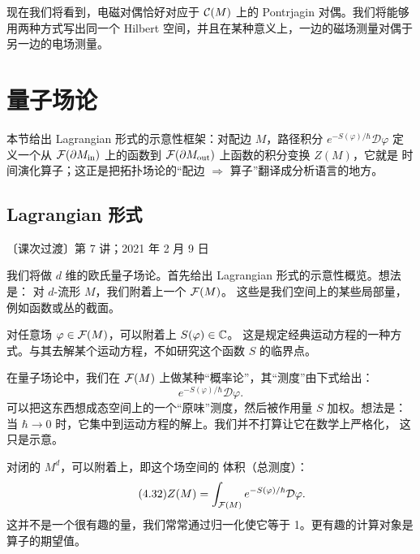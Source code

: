 
现在我们将看到，电磁对偶恰好对应于 $\mathcal{C}(M)$ 上的 Pontrjagin 对偶。我们将能够
用两种方式写出同一个 Hilbert 空间，并且在某种意义上，一边的磁场测量对偶于
另一边的电场测量。

\section{量子场论}
\begin{sectionkey}
本节给出 Lagrangian 形式的示意性框架：对配边 $M$，路径积分
$e^{-S(\varphi)/\hbar}\mathcal{D}\varphi$ 定义一个从 $\mathcal{F}(\partial M_{\mathrm{in}})$
上的函数到 $\mathcal{F}(\partial M_{\mathrm{out}})$ 上函数的积分变换 $Z(M)$，它就是
时间演化算子；这正是把拓扑场论的“配边 $\Rightarrow$ 算子”翻译成分析语言的地方。
\end{sectionkey}

\subsection{Lagrangian 形式}
\label{sec:4-4-1}

\begin{flushright}\small 〔课次过渡〕第 7 讲；2021 年 2 月 9 日\end{flushright}

我们将做 $d$ 维的欧氏量子场论。首先给出 Lagrangian 形式的示意性概览。想法是：
对 $d$-流形 $M$，我们附着上一个 $\mathcal{F}(M)$。
这些是我们空间上的某些局部量，例如函数或丛的截面。

对任意场 $\varphi\in\mathcal{F}(M)$，可以附着上 $S(\varphi)\in\mathbb{C}$。
这是规定经典运动方程的一种方式。与其去解某个运动方程，不如研究这个函数 $S$
的临界点。

在量子场论中，我们在 $\mathcal{F}(M)$ 上做某种“概率论”，其“测度”由下式给出：
\begin{equation}\tag{4.31}
e^{-S(\varphi)/\hbar}\mathcal{D}\varphi.
\end{equation}
可以把这东西想成态空间上的一个“原味”测度，然后被作用量 $S$ 加权。想法是：
当 $\hbar\to0$ 时，它集中到运动方程的解上。我们并不打算让它在数学上严格化，
这只是示意。

对闭的 $M^{d}$，可以附着上，即这个场空间的
体积（总测度）：
\begin{equation}\tag{4.32}
Z(M)=\int_{\mathcal{F}(M)}e^{-S(\varphi)/\hbar}\mathcal{D}\varphi.
\end{equation}
这并不是一个很有趣的量，我们常常通过归一化使它等于 1。更有趣的计算对象是
算子的期望值。

